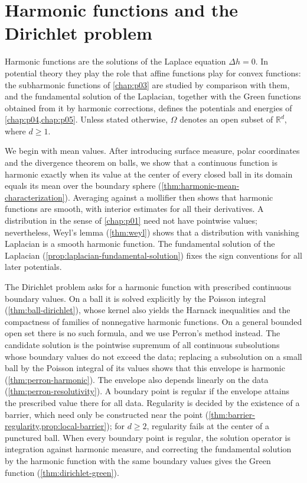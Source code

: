 \chapter{Harmonic functions and the Dirichlet problem}
\label{chap:p02}
Harmonic functions are the solutions of the Laplace equation $\Delta h=0$. In potential theory they play the role that affine functions play for convex functions: the subharmonic functions of \cref{chap:p03} are studied by comparison with them, and the fundamental solution of the Laplacian, together with the Green functions obtained from it by harmonic corrections, defines the potentials and energies of \cref{chap:p04,chap:p05}. Unless stated otherwise, $\Omega$ denotes an open subset of $\mathbb R^d$, where $d\geq1$.

We begin with mean values. After introducing surface measure, polar coordinates and the divergence theorem on balls, we show that a continuous function is harmonic exactly when its value at the center of every closed ball in its domain equals its mean over the boundary sphere (\cref{thm:harmonic-mean-characterization}). Averaging against a mollifier then shows that harmonic functions are smooth, with interior estimates for all their derivatives. A distribution in the sense of \cref{chap:p01} need not have pointwise values; nevertheless, Weyl's lemma (\cref{thm:weyl}) shows that a distribution with vanishing Laplacian is a smooth harmonic function. The fundamental solution of the Laplacian (\cref{prop:laplacian-fundamental-solution}) fixes the sign conventions for all later potentials.

The Dirichlet problem asks for a harmonic function with prescribed continuous boundary values. On a ball it is solved explicitly by the Poisson integral (\cref{thm:ball-dirichlet}), whose kernel also yields the Harnack inequalities and the compactness of families of nonnegative harmonic functions. On a general bounded open set there is no such formula, and we use Perron's method instead. The candidate solution is the pointwise supremum of all continuous subsolutions whose boundary values do not exceed the data; replacing a subsolution on a small ball by the Poisson integral of its values shows that this envelope is harmonic (\cref{thm:perron-harmonic}). The envelope also depends linearly on the data (\cref{thm:perron-resolutivity}). A boundary point is regular if the envelope attains the prescribed value there for all data. Regularity is decided by the existence of a barrier, which need only be constructed near the point (\cref{thm:barrier-regularity,prop:local-barrier}); for $d\geq2$, regularity fails at the center of a punctured ball. When every boundary point is regular, the solution operator is integration against harmonic measure, and correcting the fundamental solution by the harmonic function with the same boundary values gives the Green function (\cref{thm:dirichlet-green}).

